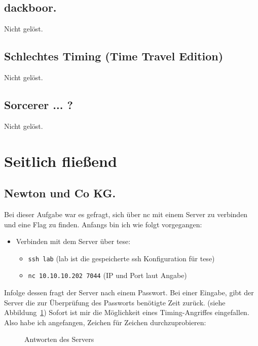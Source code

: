 \documentclass[12pt, a4paper, titlepage, oneside]{scrartcl}
\begin{document}
	\subsection{dackboor.}
	Nicht gelöst.

	\subsection{Schlechtes Timing (Time Travel Edition)}
	Nicht gelöst.

	\subsection{Sorcerer ... ?}
	Nicht gelöst.

	\newpage

	\section{Seitlich fließend}

	\subsection{Newton und Co KG.}
	Bei dieser Aufgabe war es gefragt, sich über nc mit einem Server zu verbinden
	und eine Flag zu finden. Anfangs bin ich wie folgt vorgegangen:
	\begin{itemize}
		\item Verbinden mit dem Server über tese:
			\begin{itemize}
				\item \lstinline{ssh lab} (lab ist die gespeicherte ssh Konfiguration für
					tese)

				\item \lstinline{nc 10.10.10.202 7044} (IP und Port laut Angabe)
			\end{itemize}
	\end{itemize}
	Infolge dessen fragt der Server nach einem Passwort. Bei einer Eingabe, gibt
	der Server die zur Überprüfung des Passworts benötigte Zeit zurück. (siehe
	Abbildung~\ref*{fig:newton1}) Sofort ist mir die Möglichkeit eines Timing-Angriffes
	eingefallen. Also habe ich angefangen, Zeichen für Zeichen durchzuprobieren:

	\begin{figure}[h!]
		\centering
		\caption{Antworten des Servers}
		\label{fig:newton1}
	\end{figure}
\end{document}
